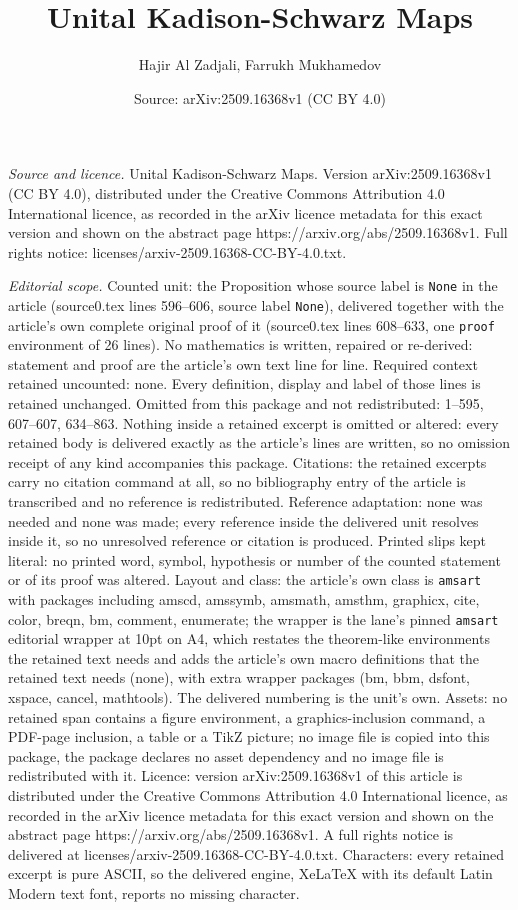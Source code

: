 \documentclass[10pt,a4paper]{amsart}
\title[Unital Kadison-Schwarz Maps]{Unital Kadison-Schwarz Maps}
\author{Hajir Al Zadjali, Farrukh Mukhamedov}
\date{Source: arXiv:2509.16368v1 (CC BY 4.0)}
\begin{document}
\maketitle

\noindent\emph{Source and licence.} Unital Kadison-Schwarz Maps. Version arXiv:2509.16368v1 (CC BY 4.0), distributed under the Creative Commons Attribution 4.0 International licence, as recorded in the arXiv licence metadata for this exact version and shown on the abstract page https://arxiv.org/abs/2509.16368v1. Full rights notice: licenses/arxiv-2509.16368-CC-BY-4.0.txt.\par\smallskip

\noindent\textit{Editorial scope.} Counted unit: the Proposition whose source label is \texttt{None} in the article (source0.tex lines 596--606, source label \texttt{None}), delivered together with the article's own complete original proof of it (source0.tex lines 608--633, one \texttt{proof} environment of 26 lines). No mathematics is written, repaired or re-derived: statement and proof are the article's own text line for line. Required context retained uncounted: none. Every definition, display and label of those lines is retained unchanged. Omitted from this package and not redistributed: 1--595, 607--607, 634--863. Nothing inside a retained excerpt is omitted or altered: every retained body is delivered exactly as the article's lines are written, so no omission receipt of any kind accompanies this package. Citations: the retained excerpts carry no citation command at all, so no bibliography entry of the article is transcribed and no reference is redistributed. Reference adaptation: none was needed and none was made; every reference inside the delivered unit resolves inside it, so no unresolved reference or citation is produced. Printed slips kept literal: no printed word, symbol, hypothesis or number of the counted statement or of its proof was altered. Layout and class: the article's own class is \texttt{amsart} with packages including amscd, amssymb, amsmath, amsthm, graphicx, cite, color, breqn, bm, comment, enumerate; the wrapper is the lane's pinned \texttt{amsart} editorial wrapper at 10pt on A4, which restates the theorem-like environments the retained text needs and adds the article's own macro definitions that the retained text needs (none), with extra wrapper packages (bm, bbm, dsfont, xspace, cancel, mathtools). The delivered numbering is the unit's own. Assets: no retained span contains a figure environment, a graphics-inclusion command, a PDF-page inclusion, a table or a TikZ picture; no image file is copied into this package, the package declares no asset dependency and no image file is redistributed with it. Licence: version arXiv:2509.16368v1 of this article is distributed under the Creative Commons Attribution 4.0 International licence, as recorded in the arXiv licence metadata for this exact version and shown on the abstract page https://arxiv.org/abs/2509.16368v1. A full rights notice is delivered at licenses/arxiv-2509.16368-CC-BY-4.0.txt. Characters: every retained excerpt is pure ASCII, so the delivered engine, XeLaTeX with its default Latin Modern text font, reports no missing character.
\end{document}

